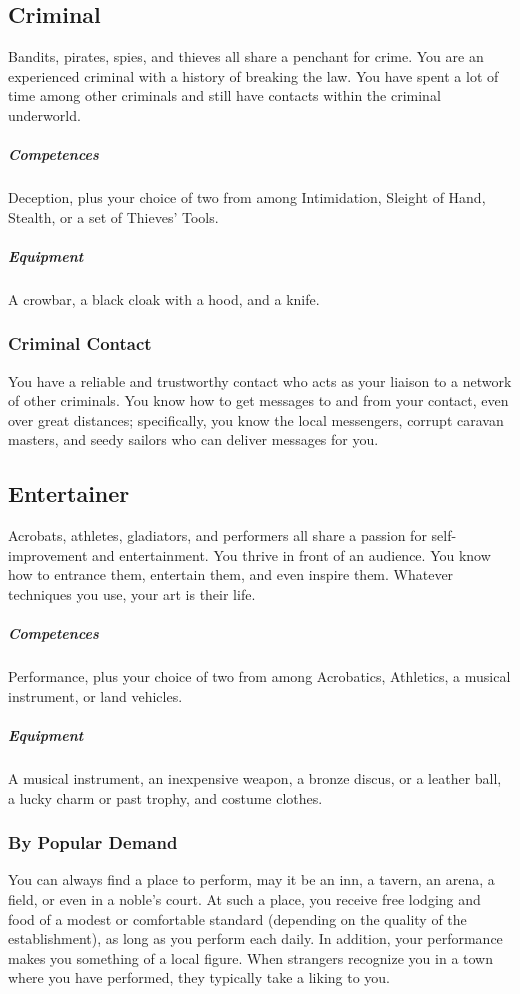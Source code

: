 \subsection*{Criminal} \label{ssec::criminal}
    Bandits, pirates, spies, and thieves all share a penchant for crime.
    You are an experienced criminal with a history of breaking the law.
    You have spent a lot of time among other criminals and still have contacts within the criminal underworld.
    \subparagraph{Competences} Deception, plus your choice of two from among Intimidation, Sleight of Hand, Stealth, or a set of Thieves' Tools.
    \subparagraph{Equipment} A crowbar, a black cloak with a hood, and a knife.
    \subsubsection{Criminal Contact}
        You have a reliable and trustworthy contact who acts as your liaison to a network of other criminals.
        You know how to get messages to and from your contact, even over great distances; specifically, you know the local messengers, corrupt caravan masters, and seedy sailors who can deliver messages for you.

\subsection*{Entertainer} \label{ssec::entertainer}
    Acrobats, athletes, gladiators, and performers all share a passion for self-improvement and entertainment. %
    You thrive in front of an audience.
    You know how to entrance them, entertain them, and even inspire them.
    Whatever techniques you use, your art is their life.
    \subparagraph{Competences} Performance, plus your choice of two from among Acrobatics, Athletics, a musical instrument, or land vehicles.
    \subparagraph{Equipment} A musical instrument, an inexpensive weapon, a bronze discus, or a leather ball, a lucky charm or past trophy, and costume clothes.
    \subsubsection{By Popular Demand}
        You can always find a place to perform, may it be an inn, a tavern, an arena, a field, or even in a noble's court.
        At such a place, you receive free lodging and food of a modest or comfortable standard (depending on the quality of the establishment), as long as you perform each daily.
        In addition, your performance makes you something of a local figure.
        When strangers recognize you in a town where you have performed, they typically take a liking to you.

